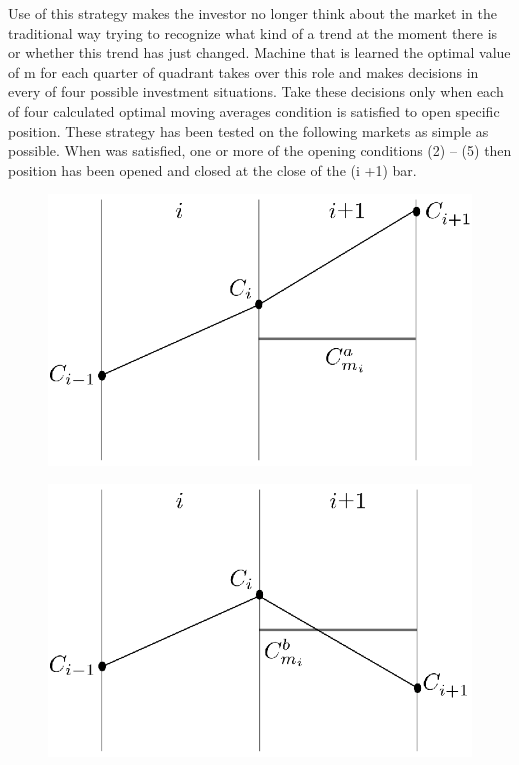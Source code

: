 \documentclass{tewiart}
\begin{document}
Use of this strategy makes the investor no longer think about the market in the traditional way trying to recognize what kind of a trend at the moment there is or whether this trend has just changed. Machine that is learned the optimal value of m for each quarter of quadrant takes over this role and makes decisions in every of four possible investment situations. Take these decisions only when each of four calculated optimal moving averages condition is satisfied to open specific position.
These strategy has been tested on the following markets as simple as possible. When was satisfied, one or more of the opening conditions (2) – (5) then position has been opened and closed at the close of the (i +1) bar.


\begin{figure}[h]
\centering
\begin{minipage}{.49\linewidth}
\centering \includegraphics[width=\textwidth]{rysunek2a.eps}
\label{jedno}
\end{minipage}
\begin{minipage}{.49\linewidth}
\centering \includegraphics[width=\textwidth]{rysunek2b.eps}

\end{minipage}
\end{figure}
\end{document}
